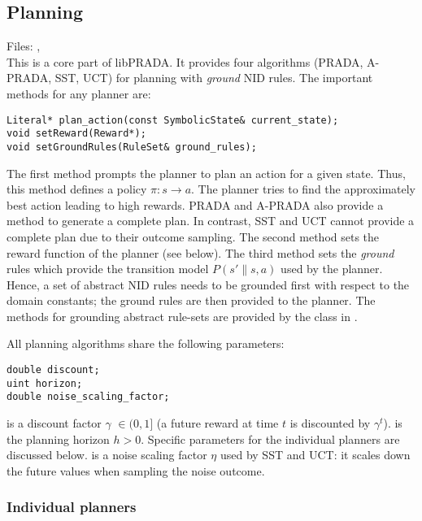 \documentclass[10pt,twoside,twocolumn,fleqn]{article}
\begin{document}

\subsection{Planning}

Files: , \\

This is a core part of libPRADA. It provides four algorithms (PRADA,
A-PRADA, SST, UCT) for planning with \emph{ground} NID rules. The important
methods for any planner are:
\begin{lstlisting}
Literal* plan_action(const SymbolicState& current_state);
void setReward(Reward*);
void setGroundRules(RuleSet& ground_rules);
\end{lstlisting}
The first method prompts the planner to plan an action for a given state.
Thus, this method defines a policy $\pi: s \to a$. The planner tries to
find the approximately best action leading to high rewards. PRADA and
A-PRADA also provide a method to generate a complete plan. In contrast, SST
and UCT cannot provide a complete plan due to their outcome sampling. The
second method sets the reward function of the planner (see below). The
third method sets the \emph{ground} rules which provide the transition
model $P(s'\|s,a)$ used by the planner. Hence, a set of abstract NID rules
needs to be grounded first with respect to the domain constants; the ground
rules are then provided to the planner. The methods for grounding abstract
rule-sets are provided by the class  in
.

All planning algorithms share the following parameters:
\begin{lstlisting}
double discount;
uint horizon;
double noise_scaling_factor;
\end{lstlisting}
 is a discount factor $\gamma$ $\in (0,1]$ (a future reward
at time $t$ is discounted by $\gamma^t$).  is the planning
horizon $h>0$. Specific parameters for the individual planners are
discussed below.  is a noise scaling factor
$\eta$ used by SST and UCT: it scales down the future values when sampling
the noise outcome.


\subsubsection{Individual planners}
\end{document}
